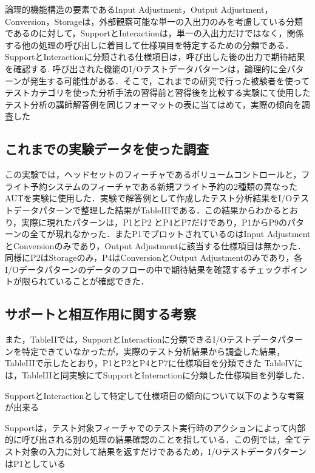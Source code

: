 \documentclass[a4paper,12pt]{jreport}
\begin{document}

論理的機能構造の要素であるInput Adjustment，Output Adjustment，Conversion，Storageは，外部観察可能な単一の入出力のみを考慮している分類であるのに対して，SupportとInteractionは，単一の入出力だけではなく，関係する他の処理の呼び出しに着目して仕様項目を特定するための分類である．
SupportとInteractionに分類される仕様項目は，呼び出した後の出力で期待結果を確認する. 呼び出された機能のI/Oテストデータパターンは，論理的に全パターンが発生する可能性がある．そこで，これまでの研究で行った被験者を使ってテストカテゴリを使った分析手法の習得前と習得後を比較する実験にて使用したテスト分析の講師解答例を同じフォーマットの表に当てはめて，実際の傾向を調査した

\subsection{これまでの実験データを使った調査}
この実験では，ヘッドセットのフィーチャであるボリュームコントロールと，フライト予約システムのフィーチャである新規フライト予約の2種類の異なったAUTを実験に使用した．実験で解答例として作成したテスト分析結果をI/Oテストデータパターンで整理した結果がTableIIIである．この結果からわかるとおり，実際に現れたパターンは，P1とP2 とP4とP7だけであり，P1からP9のパターンの全てが現れなかった．またP1でプロットされているのはInput AdjustmentとConversionのみであり，Output Adjustmentに該当する仕様項目は無かった．同様にP2はStorageのみ，P4はConversionとOutput Adjustmentのみであり，各I/Oデータパターンのデータのフローの中で期待結果を確認するチェックポイントが限られていることが確認できた．

\subsection{サポートと相互作用に関する考察}
また，TableIIでは，SupportとInteractionに分類できるI/Oテストデータパターンを特定できていなかったが，実際のテスト分析結果から調査した結果，
TableIIIで示したとおり，P1とP2とP4とP7に仕様項目を分類できた
TableIVには，TableIIIと同実験にてSupportとInteractionに分類した仕様項目を列挙した．

SupportとInteractionとして特定して仕様項目の傾向について以下のような考察が出来る

Supportは，テスト対象フィーチャでのテスト実行時のアクションによって内部的に呼び出される別の処理の結果確認のことを指している．この例では，全てテスト対象の入力に対して結果を返すだけであるため，I/OテストデータパターンはP1としている
\end{document}
